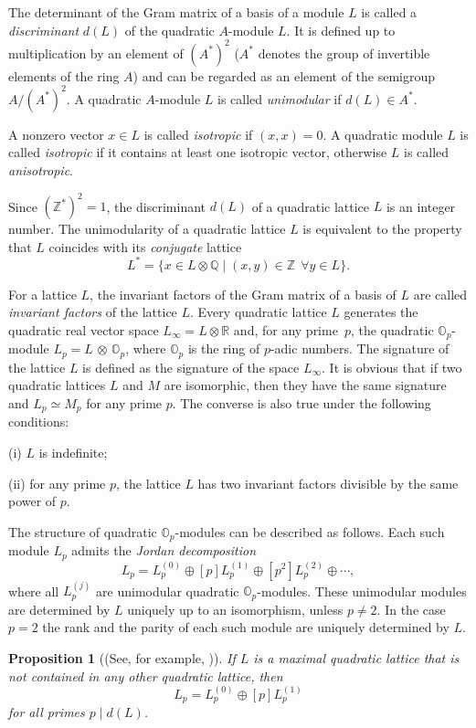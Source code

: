 \documentclass[reqno,12pt]{amsart}
\newcounter{z}
\newtheorem{proposition}{\indent Proposition}%
\begin{document}
The determinant of the Gram matrix of a basis of a module $L$  is called
a \textit{discriminant} $d (L)$ of the quadratic $A$-module $L$.
It is defined up to multiplication by an element of $(A^*)^2 $ ($A^*$
denotes the group of invertible elements of the ring $A$) and can be regarded as
an element of the semigroup $A /(A^*)^2$.
A quadratic $A$-module $L$ is called \textit{unimodular} if $d(L) \in A^*$.

A nonzero vector $x \in L $ is called \textit{isotropic} if $(x, x) = 0$.
A quadratic
module $L$ is called \textit{isotropic} if it contains at least one
isotropic vector,
otherwise $L$ is called \textit{anisotropic}.

Since $(\mathbb{Z}^*)^2 = {1}$, the discriminant $d (L)$ of a
quadratic lattice $L$
is  an integer number. The unimodularity of a quadratic lattice $L$ is
equivalent to the property that $L$ coincides with its \textit{conjugate} lattice
$$
L^* = \{x \in L \otimes \mathbb{Q} \mid (x, y)
\in \mathbb {Z} \ \  \forall y \in L \}.
$$

For a lattice $L$, the invariant factors of the Gram matrix of a basis of $L$
are called \textit {invariant factors} of the lattice $L$.
Every quadratic lattice $L$ generates the quadratic real vector
space
$L_{\infty} = L \otimes \mathbb{R}$ and, for any prime~$p$, the quadratic $\mathbb{O}_p$-module
$L_p = L\,{\otimes}\,\mathbb{O}_p$, where $\mathbb {O}_p$ is the ring
of $p$-adic numbers.
The signature of
 the lattice $ L $ is defined as the signature of the space $ L_{\infty}$.
 It is obvious that if two quadratic
lattices $L$ and $M$ are isomorphic, then
they have the same signature and $ L_p \simeq M_p $ for any prime $p$.
The converse is also true under the following conditions:

(i) $L$ is indefinite;

(ii) for any prime $p$, the lattice $L$ has two invariant factors
divisible by  the same power of $p$.

The structure of quadratic $\mathbb{O}_p$-modules
can be described as follows.
Each such module
$L_p$ admits the \textit{Jordan decomposition}
$$
L_p = L_p^{(0)} \oplus [p] L_p^{(1)} \oplus [p^2] L_p^{(2)} \oplus \cdots,
$$
where all $L_p^{(j)}$ are unimodular quadratic $\mathbb{O}_p$-modules.
These unimodular modules are determined by $L$ uniquely up to an isomorphism, unless
$p \not = 2$. In the case $p = 2$ the rank and the parity of each such module are uniquely
determined by $L$.


\begin{proposition}[{\rm(See, for example, \cite{Vin84})}]
\label{p3.1}
If $L$ is a maximal quadratic lattice that is not contained
in any other quadratic lattice, then
$$
L_p=L_p^{(0)} \oplus [p] L_p^{(1)}
$$
for all primes $p\mid d(L)$.
\end{proposition}
\end{document}
